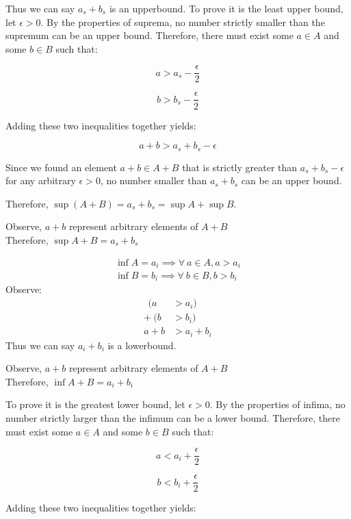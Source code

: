 \documentclass[11pt]{article}
\theoremstyle{plain}
\begin{document}
Thus we can say $a_s + b_s$ is an upperbound.
To prove it is the least upper bound, let $\epsilon > 0$.
By the properties of suprema, no number strictly smaller than the supremum can be an upper bound. Therefore, there must exist some $a \in A$ and some $b \in B$ such that:


$$a > a_s - \frac{\epsilon}{2}$$

$$b > b_s - \frac{\epsilon}{2}$$


Adding these two inequalities together yields:


$$a + b > a_s + b_s - \epsilon$$


Since we found an element $a+b \in A+B$ that is strictly greater than $a_s + b_s - \epsilon$ for any arbitrary $\epsilon > 0$, no number smaller than $a_s + b_s$ can be an upper bound.

Therefore, $\sup(A+B) = a_s + b_s = \sup A + \sup B$.

\begin{center}
	Observe, $a+b$ represent arbitrary elements of $A+B$ \\
	Therefore, $\sup A+B = a_s + b_s$
\end{center}
\[
	\begin{aligned}
		\inf A = a_i \implies \forall ~a \in A, a > a_i \\
		\inf B = b_i \implies \forall ~b \in B, b > b_i
	\end{aligned}
\]
Observe:
\[
	\begin{aligned}
		~~(a  & > a_i)      \\
		+ ~(b & > b_i)      \\
		\hline
		a + b & > a_i + b_i
	\end{aligned}
\]
Thus we can say $a_i + b_i$ is a lowerbound.

\begin{center}
	Observe, $a+b$ represent arbitrary elements of $A+B$ \\
	Therefore, $\inf A+B = a_i + b_i$
\end{center}


To prove it is the greatest lower bound, let $\epsilon > 0$.
By the properties of infima, no number strictly larger than the infimum can be a lower bound. Therefore, there must exist some $a \in A$ and some $b \in B$ such that:


$$a < a_i + \frac{\epsilon}{2}$$

$$b < b_i + \frac{\epsilon}{2}$$


Adding these two inequalities together yields:
\end{document}
